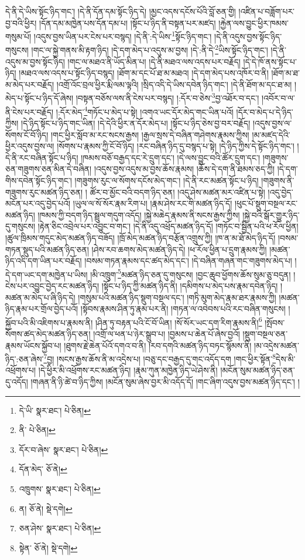 དེ་ནི་དེ་ཡིས་སྟོང་ཉིད་གང་། །དེ་ནི་དོན་དམ་སྟོང་ཉིད་དེ། །མྱང་འདས་དངོས་པོའི་བློ་ཅན་གྱི། །འཛིན་པ་བཟློག་པར་བྱ་བའི་ཕྱིར། །དོན་དམ་མཁྱེན་པས་དོན་དམ་པ། །སྟོང་པ་ཉིད་ནི་བསྟན་པར་མཛད། །རྐྱེན་ལས་བྱུང་ཕྱིར་ཁམས་གསུམ་པོ། །འདུས་བྱས་ཡིན་པར་ངེས་པར་བསྙད། །དེ་ནི་:དེ་ཡིས་\footnote{དེ་ཡི་  སྣར་ཐང་།  པེ་ཅིན། }སྟོང་ཉིད་གང་། །དེ་ནི་འདུས་བྱས་སྟོང་ཉིད་གསུངས། །གང་ལ་སྐྱེ་གནས་མི་རྟག་ཉིད། །དེ་དག་མེད་པ་འདུས་མ་བྱས། །དེ་:ནི་དེ་\footnote{ནི་  པེ་ཅིན། }ཡིས་སྟོང་ཉིད་གང་། །དེ་ནི་འདུས་མ་བྱས་སྟོང་ཉིད། །གང་ལ་མཐའ་ནི་ཡོད་མིན་པ། །དེ་ནི་མཐའ་ལས་འདས་པར་བརྗོད། །དེ་དེ་ཁོ་ནས་སྟོང་པ་ཉིད། །མཐའ་ལས་འདས་པ་སྟོང་ཉིད་བསྙད། །ཐོག་མ་དང་པོ་ཐ་མ་མཐའ། །དེ་དག་མེད་པས་འཁོར་བ་ནི། །ཐོག་མ་ཐ་མ་མེད་པར་བརྗོད། །འགྲོ་འོང་བྲལ་ཕྱིར་རྨི་ལམ་ལྟའི། །སྲིད་འདི་དེ་ཡིས་དབེན་ཉིད་གང་། །དེ་ནི་ཐོག་མ་དང་ཐ་མ། །མེད་པ་སྟོང་པ་ཉིད་དོ་ཞེས། །བསྟན་བཅོས་ལས་ནི་ངེས་པར་བསྙད། །:དོར་བ་ཅེས་\footnote{དོར་བ་ཞེས་  སྣར་ཐང་།  པེ་ཅིན། }བྱ་འཐོར་བ་དང་། །འབོར་བ་ལ་ནི་ངེས་པར་བརྗོད། །:དོར་མེད་\footnote{དོན་མེད་  ཅོ་ནེ། }གཏོང་པ་མེད་པ་སྟེ། །འགའ་ཡང་དོར་མེད་གང་ཡིན་པའོ། །དོར་བ་མེད་པ་དེ་ཉིད་ཀྱིས། །དེ་ཉིད་སྟོང་པ་ཉིད་གང་ཡིན། །དེ་དེའི་ཕྱིར་ན་དོར་མེད་པ། །སྟོང་པ་ཉིད་ཅེས་བྱ་བར་བརྗོད། །འདུས་བྱས་ལ་སོགས་ངོ་བོ་ཉིད། །གང་ཕྱིར་སློབ་མ་རང་སངས་རྒྱས། །རྒྱལ་སྲས་དེ་བཞིན་གཤེགས་རྣམས་ཀྱིས། །མ་མཛད་དེའི་ཕྱིར་འདུས་བྱས་ལ། །སོགས་པ་རྣམས་ཀྱི་ངོ་བོ་ཉིད། །རང་བཞིན་ཉིད་དུ་བསྙད་པ་སྟེ། །དེ་ཉིད་ཀྱིས་དེ་སྟོང་ཉིད་གང་། །དེ་ནི་རང་བཞིན་སྟོང་པ་ཉིད། །ཁམས་བཅོ་བརྒྱད་དང་རེ་དྲུག་དང་། །དེ་ལས་བྱུང་བའི་ཚོར་དྲུག་དང་། །གཟུགས་ཅན་གཟུགས་ཅན་མིན་དེ་བཞིན། །འདུས་བྱས་འདུས་མ་བྱས་ཆོས་རྣམས། །ཆོས་དེ་དག་ནི་ཐམས་ཅད་ཀྱི། །དེ་དག་གིས་དབེན་སྟོང་ཉིད་གང་། །གཟུགས་རུང་ལ་སོགས་དངོས་མེད་གང་། །དེ་ནི་རང་མཚན་སྟོང་པ་ཉིད། །གཟུགས་ནི་གཟུགས་རུང་མཚན་ཉིད་ཅན། །
ཚོར་བ་མྱོང་བའི་བདག་ཉིད་ཅན། །འདུ་ཤེས་མཚན་མར་འཛིན་པ་སྟེ། །འདུ་བྱེད་མངོན་པར་འདུ་བྱེད་པའོ། །ཡུལ་ལ་སོ་སོར་རྣམ་རིག་པ། །རྣམ་ཤེས་རང་གི་མཚན་ཉིད་དོ། །ཕུང་པོ་སྡུག་བསྔལ་རང་མཚན་ཉིད། །ཁམས་ཀྱི་བདག་ཉིད་སྦྲུལ་གདུག་འདོད། །སྐྱེ་མཆེད་རྣམས་ནི་སངས་རྒྱས་ཀྱིས། །སྐྱེ་བའི་སྒོར་གྱུར་ཉིད་དུ་གསུངས། །རྟེན་ཅིང་འབྲེལ་པར་འབྱུང་བ་གང་། །དེ་ནི་འདུ་འཕྲོད་མཚན་ཉིད་དོ། །གཏོང་བ་སྦྱིན་པའི་ཕ་རོལ་ཕྱིན། །ཚུལ་ཁྲིམས་གདུང་མེད་མཚན་ཉིད་བཟོད། །ཁྲོ་མེད་མཚན་ཉིད་བརྩོན་འགྲུས་ཀྱི། །ཁ་ན་མ་ཐོ་མེད་ཉིད་དོ། །བསམ་གཏན་སྡུད་པའི་མཚན་ཉིད་ཅན། །ཤེས་རབ་ཆགས་མེད་མཚན་ཉིད་དེ། །ཕ་རོལ་ཕྱིན་པ་དྲུག་རྣམས་ཀྱི། །མཚན་ཉིད་འདི་དག་ཡིན་པར་བརྗོད། །བསམ་གཏན་རྣམས་དང་ཚད་མེད་དང་། །དེ་བཞིན་གཞན་གང་གཟུགས་མེད་པ། །དེ་དག་ཡང་དག་མཁྱེན་པ་ཡིས། །མི་འཁྲུག་\footnote{འཁྲུགས་  སྣར་ཐང་།  པེ་ཅིན། }མཚན་ཉིད་ཅན་དུ་གསུངས། །བྱང་ཆུབ་ཕྱོགས་ཆོས་སུམ་ཅུ་བདུན། །ངེས་པར་འབྱུང་བྱེད་རང་མཚན་ཉིད། །སྟོང་པ་ཉིད་ཀྱི་མཚན་ཉིད་ནི། །དམིགས་པ་མེད་པས་རྣམ་དབེན་ཉིད། །མཚན་མ་མེད་པ་ཞི་ཉིད་དེ། །གསུམ་པའི་མཚན་ཉིད་སྡུག་བསྔལ་དང་། །གཏི་མུག་མེད་རྣམ་ཐར་རྣམས་ཀྱི། །མཚན་ཉིད་རྣམ་པར་གྲོལ་བྱེད་པའོ། །སྟོབས་རྣམས་ཤིན་ཏུ་རྣམ་པར་ནི། །གཏན་ལ་འབེབས་པའི་རང་བཞིན་གསུངས། །སྐྱོབ་པའི་མི་འཇིགས་པ་རྣམས་ནི། །ཤིན་ཏུ་བརྟན་པའི་ངོ་བོ་ཡིན། །སོ་སོར་ཡང་དག་རིག་རྣམས་ནི།\footnote{ན།  ཅོ་ནེ།  སྡེ་དགེ། } །སྤོབས་སོགས་ཚད་མེད་མཚན་ཉིད་ཅན། །འགྲོ་ལ་ཕན་པ་ཉེར་སྒྲུབ་པ། །བྱམས་པ་ཆེན་པོ་ཞེས་བྱའོ། །སྡུག་བསྔལ་ཅན་རྣམས་ཡོངས་སྐྱོབ་པ། །ཐུགས་རྗེ་ཆེན་པོའོ་དགའ་བ་ནི། །རབ་དགའི་མཚན་ཉིད་བཏང་སྙོམས་ནི། །མ་འདྲེས་མཚན་ཉིད་:ཅན་ཞེས་\footnote{ཅན་ཤེས་  སྣར་ཐང་།  པེ་ཅིན། }བྱ། །སངས་རྒྱས་ཆོས་ནི་མ་འདྲེས་པ། །བཅུ་དང་བརྒྱད་དུ་གང་འདོད་དག །གང་ཕྱིར་སྟོན་\footnote{སྟེན་  ཅོ་ནེ།  སྡེ་དགེ། }དེས་མི་འཕྲོགས་པ། །དེ་ཕྱིར་མི་འཕྲོགས་རང་མཚན་ཉིད། །རྣམ་ཀུན་མཁྱེན་ཉིད་ཡེ་ཤེས་ནི། །མངོན་སུམ་མཚན་ཉིད་ཅན་དུ་འདོད། །གཞན་ནི་ཉི་ཚེ་བ་ཉིད་ཀྱིས། །མངོན་སུམ་ཞེས་བྱར་མི་འདོད་དོ། །གང་ཞིག་འདུས་བྱས་མཚན་ཉིད་དང་། །

